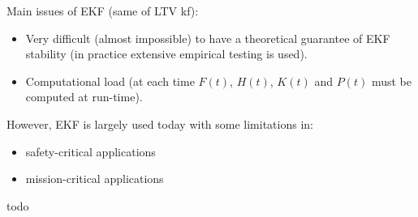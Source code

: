 \begin{remark}
    Main issues of EKF (same of LTV \gls{kf}):
    \begin{itemize}
        \item Very difficult (almost impossible) to have a theoretical guarantee of EKF stability (in practice extensive empirical testing is used).
        \item Computational load (at each time $F(t)$, $H(t)$, $K(t)$ and $P(t)$ must be computed at run-time).
    \end{itemize}

    However, EKF is largely used today with some limitations in:
    \begin{itemize}
        \item safety-critical applications
        \item mission-critical applications
    \end{itemize}
\end{remark}

{\Huge todo}


